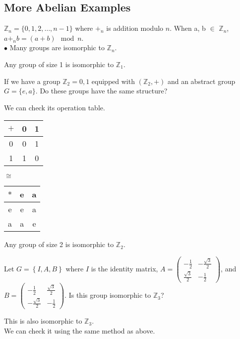 \subsection{More Abelian Examples}

\begin{eg}
    $\mathbb{Z}_n = \{0, 1, 2, \ldots, n-1\}$ where $+_n$ is addition modulo $n$.
    When a, b $\in$ $\mathbb{Z}_n$, $a +_n b = (a + b) \mod n$.\\
    $\bullet$ Many groups are isomorphic to $\mathbb{Z}_n$.
\end{eg}

\begin{remark}[Fact]
    Any group of size 1 is isomorphic to $\mathbb{Z}_1$.
\end{remark}

\begin{exercise}
    If we have a group $\mathbb{Z}_2 = {0, 1}$ equipped with $(\mathbb{Z}_2, +)$ and an abstract group $G = \{e, a\}$. Do these groups have the same structure?\\
\end{exercise}
\begin{answer}
    We can check its operation table.\\
    \begin{center}
        \begin{tabular}{c|cc}
            $+$ & 0 & 1\\
            \hline
            0 & 0 & 1\\
            1 & 1 & 0
        \end{tabular}
        \quad $\cong$ \quad
        \begin{tabular}{c|cc}
            $*$ & e & a\\
            \hline
            e & e & a\\
            a & a & e
        \end{tabular}
    \end{center}
\end{answer}

\begin{remark}[Fact]
    Any group of size 2 is isomorphic to $\mathbb{Z}_2$.
\end{remark}

\begin{exercise}
    Let $G = \left\{ I, A, B \right\}$ where $I$ is the identity matrix, 
    $A = \begin{pmatrix} -\frac{1}{2} & -\frac{\sqrt{3}}{2} \\ \frac{\sqrt{3}}{2} & -\frac{1}{2} \end{pmatrix}$, and 
    $B = \begin{pmatrix} -\frac{1}{2} & \frac{\sqrt{3}}{2} \\ -\frac{\sqrt{3}}{2} & -\frac{1}{2} \end{pmatrix}$.
    Is this group isomorphic to $\mathbb{Z}_3$?\\
\end{exercise}
\begin{answer}
    This is also isomorphic to $\mathbb{Z}_3$.\\ We can check it using the same method as above.
\end{answer}

